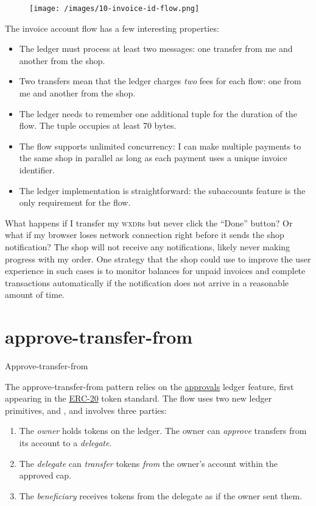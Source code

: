 \documentclass{article}
\begin{document}
\begin{figure}[grayscale-diagram]
\texttt{[image: /images/10-invoice-id-flow.png]}
\end{figure}

The invoice account flow has a few interesting properties:
\begin{itemize}
  \item The ledger must process at least two messages: one transfer from me and another from the shop.
  \item Two transfers mean that the ledger charges \emph{two} fees for each flow: one from me and another from the shop.
  \item 
    The ledger needs to remember one additional  tuple for the duration of the flow.
    The tuple occupies at least 70 bytes.
  \item The flow supports unlimited concurrency: I can make multiple payments to the same shop in parallel as long as each payment uses a unique invoice identifier.
  \item 
    The ledger implementation is straightforward: the subaccounts feature is the only requirement for the flow.
\end{itemize}

What happens if I transfer my \textsc{wxdr}s but never click the ``Done'' button?
Or what if my browser loses network connection right before it sends the shop notification?
The shop will not receive any notifications, likely never making progress with my order.
One strategy that the shop could use to improve the user experience in such cases is to monitor balances for unpaid invoices and complete transactions automatically if the notification does not arrive in a reasonable amount of time.

\section{approve-transfer-from}{Approve-transfer-from}

The approve-transfer-from pattern relies on the \href{/posts/09-fungible-tokens-101.html#approvals}{approvals} ledger feature, first appearing in the \href{https://ethereum.org/en/developers/docs/standards/tokens/erc-20/}{ERC-20} token standard.
The flow uses two new ledger primitives,  and , and involves three parties:
\begin{enumerate}
  \item The \emph{owner} holds tokens on the ledger. The owner can \emph{approve} transfers from its account to a \emph{delegate}.
  \item The \emph{delegate} can \emph{transfer} tokens \emph{from} the owner's account within the approved cap.
  \item The \emph{beneficiary} receives tokens from the delegate as if the owner sent them.
\end{enumerate}
\end{document}
